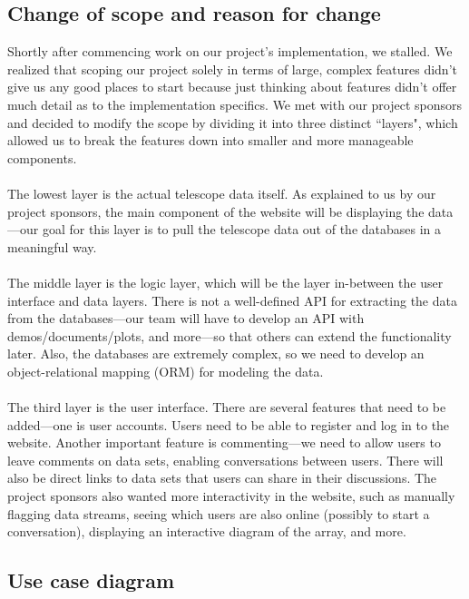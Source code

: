 \documentclass[12pt]{article}
\begin{document}
\begin{spacing}{1.5}
\subsection{Change of scope and reason for change}
Shortly after commencing work on our project's implementation, we stalled. We realized that scoping our project solely in terms of large, complex features didn't give us any good places to start because just thinking about features didn't offer much detail as to the implementation specifics. We met with our project sponsors and decided to modify the scope by dividing it into three distinct ``layers", which allowed us to break the features down into smaller and more manageable components.
\\ \\
The lowest layer is the actual telescope data itself. As explained to us by our project sponsors, the main component of the website will be displaying the data---our goal for this layer is to pull the telescope data out of the databases in a meaningful way.
\\ \\
The middle layer is the logic layer, which will be the layer in-between the user interface and data layers. There is not a well-defined API for extracting the data from the databases---our team will have to develop an API with demos/documents/plots, and more---so that others can extend the functionality later. Also, the databases are extremely complex, so we need to develop an object-relational mapping (ORM) for modeling the data. 
\\ \\
The third layer is the user interface. There are several features that need to be added---one is user accounts. Users need to be able to register and log in to the website. Another important feature is commenting---we need to allow users to leave comments on data sets, enabling conversations between users. There will also be direct links to data sets that users can share in their discussions. The project sponsors also wanted more interactivity in the website, such as manually flagging data streams, seeing which users are also online (possibly to start a conversation), displaying an interactive diagram of the array, and more.

\subsection{Use case diagram}

\end{spacing}
\end{document}
